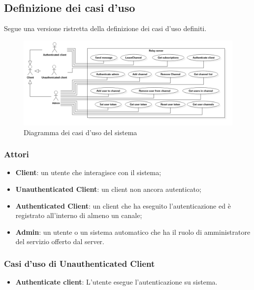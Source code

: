 	 \subsection{Definizione dei casi d'uso}
	 Segue una versione ristretta della definizione dei casi d'uso definiti.
		\begin{figure}[H]
		\begin{center}
		\includegraphics[width=17cm,keepaspectratio]{UML/png/Use Case Model__Use Cases_0}
		\caption{Diagramma dei casi d'uso del sistema}
		\end{center}
		\end{figure}

		\subsubsection{Attori}
		\begin{itemize}
			\item \textbf{Client}: un utente che interagisce con il sistema;
			\item \textbf{Unauthenticated Client}: un client non ancora autenticato;
			\item \textbf{Authenticated Client}: un client che ha eseguito l'autenticazione ed è registrato all'interno di almeno un canale;
			\item \textbf{Admin}: un utente o un sistema automatico che ha il ruolo di amministratore del servizio offerto dal server.
		\end{itemize}

		\subsubsection{Casi d'uso di Unauthenticated Client}
		\begin{itemize}
			\item \textbf{Authenticate client}: L'utente esegue l'autenticazione su sistema. 
		\end{itemize}

